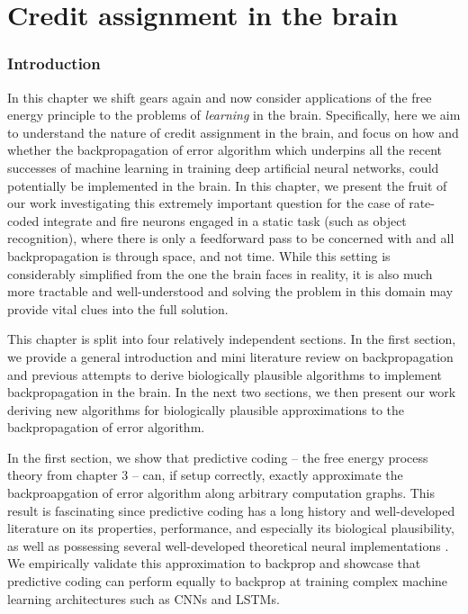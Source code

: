 \chapter{Credit assignment in the brain}

\subsection{Introduction}

In this chapter we shift gears again and now consider applications of the free energy principle to the problems of \emph{learning} in the brain. Specifically, here we aim to understand the nature of credit assignment in the brain, and focus on how and whether the backpropagation of error algorithm which underpins all the recent successes of machine learning in training deep artificial neural networks, could potentially be implemented in the brain. In this chapter, we present the fruit of our work investigating this extremely important question for the case of rate-coded integrate and fire neurons engaged in a static task (such as object recognition), where there is only a feedforward pass to be concerned with and all backpropagation is through space, and not time. While this setting is considerably simplified from the one the brain faces in reality, it is also much more tractable and well-understood and solving the problem in this domain may provide vital clues into the full solution. 

This chapter is split into four relatively independent sections. In the first section, we provide a general introduction and mini literature review on backpropagation and previous attempts to derive biologically plausible algorithms to implement backpropagation in the brain.  In the next two sections, we  then present our work deriving new algorithms for biologically plausible approximations to the backpropagation of error algorithm. 

In the first section, we show that predictive coding -- the free energy process theory from chapter 3 -- can, if setup correctly, exactly approximate the backproapgation of error algorithm along arbitrary computation graphs. This result is fascinating since predictive coding has a long history and well-developed literature on its properties, performance, and especially its biological plausibility, as well as possessing several well-developed theoretical neural implementations \citep{bastos2012canonical,keller2018predictive,kanai2015cerebral}. We empirically validate this approximation to backprop and showcase that predictive coding can perform equally to backprop at training complex machine learning architectures such as CNNs and LSTMs. 

